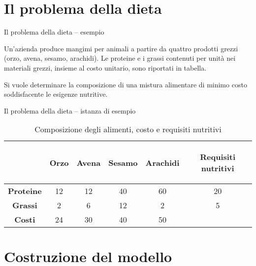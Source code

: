 \documentclass{beamer}
\begin{document}
\generatitolo

\section{Il problema della dieta}

\begin{frame}%
{Il problema della dieta -- esempio}

\begin{block}{}
Un'azienda produce mangimi per animali a partire da quattro prodotti grezzi (orzo, avena, sesamo, arachidi). Le proteine e i grassi contenuti per unità nei materiali grezzi, insieme al costo unitario, sono riportati in tabella.%

Si vuole determinare la composizione di una mistura alimentare di minimo costo soddisfacente le esigenze nutritive. 
\end{block}
\end{frame}

\begin{frame}%
{Il problema della dieta -- istanza di esempio}

\begin{table}
\begin{tabular}{c|cccc|c}\toprule
&\bf Orzo&\bf Avena&\bf Sesamo&\bf Arachidi&\parbox{1.5cm}{{\bf \begin{center}Requisiti nutritivi\end{center}}}\\\midrule
\bf Proteine & 12& 12 & 40 & 60 & 20 \\
\bf Grassi   &  2&  6 & 12 &  2 &  5 \\\midrule
\bf Costi    & 24& 30 & 40 & 50 &    \\\bottomrule
\end{tabular}
\caption{Composizione degli alimenti, costo e requisiti nutritivi}
\label{tab:istanza}
\end{table}

\end{frame}

\section{Costruzione del modello}
\end{document}
